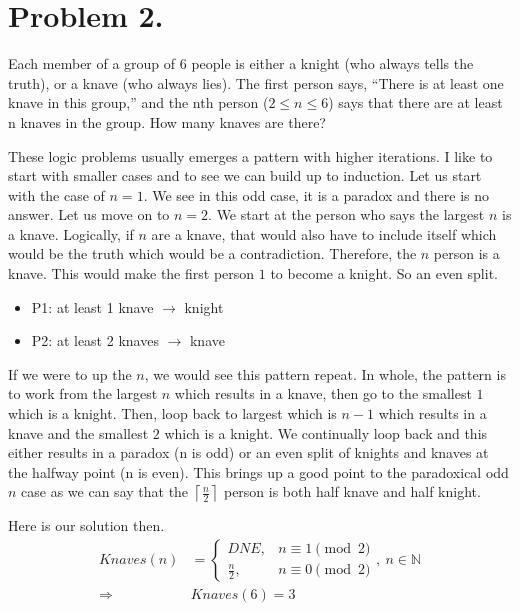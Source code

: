 \section{Problem 2.}

Each member of a group of $6$ people is either a knight (who always tells the truth), or a knave (who always lies).  
The first person says, “There is at least one knave in this group,” and the nth person ($2 \leq n \leq 6$) says that there are at least n knaves in the group. 
How many knaves are there?

\begin{solution}
    These logic problems usually emerges a pattern with higher iterations. I like to
    start with smaller cases and to see we can build up to induction. Let us start with 
    the case of $n=1$. We see in this odd case, it is a paradox and there is no answer.
    Let us move on to $n=2$. We start at the person who says the largest $n$ is a knave.
    Logically, if $n$ are a knave, that would also have to include itself which would be 
    the truth which would be a contradiction. Therefore, the $n$ person is a knave.
    This would make the first person $1$ to become a knight. So an even split.

    \begin{itemize}
     \item P1: at least 1 knave $\longrightarrow$ knight
     \item P2: at least 2 knaves $\longrightarrow$ knave
   \end{itemize}

   If we were to up the $n$, we would see this pattern repeat. In whole, the pattern is to work from the largest $n$ which results in a knave,
   then go to the smallest $1$ which is a knight. Then, loop back to largest which
   is $n-1$ which results in a knave and the smallest $2$ which is a knight. We continually
   loop back and this either results in a paradox (n is odd) or an even split of 
   knights and knaves at the halfway point (n is even). This brings up a good point to the 
   paradoxical odd $n$ case as we can say that the $\left\lceil \frac{n}{2} \right\rceil$ person is 
   both half knave and half knight. 
   
   Here is our solution then.
   \begin{align*}
        Knaves(n) &=  
        \begin{cases}
			DNE, & n \equiv 1 \pmod{2} \\
            \frac{n}{2}, & n \equiv 0 \pmod{2}
		 \end{cases}, \ n \in \mathbb{N} \\
        \Longrightarrow & \boxed{Knaves(6) = 3}
   \end{align*}
   
\end{solution}